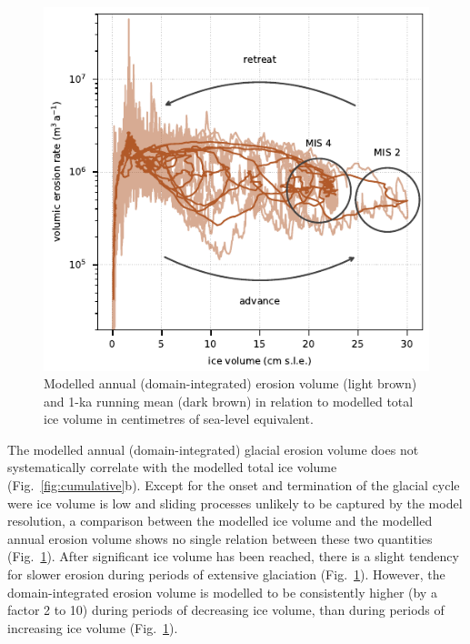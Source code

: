 \documentclass[esurf, manuscript]{copernicus}
\begin{document}
    \begin{figure}[ht]
      \centerline{\includegraphics{alpero_evolution}}
      \caption{%
        Modelled annual (domain-integrated) erosion volume (light brown) and 1-ka
        running mean (dark brown) in relation to modelled total ice volume in
        centimetres of sea-level equivalent.}
      \label{fig:evolution}
    \end{figure}

    The modelled annual (domain-integrated) glacial erosion volume
    does not systematically correlate with the modelled total ice volume
    (Fig.~\ref{fig:cumulative}b). Except for the onset and termination of the
    glacial cycle were ice volume is low and sliding processes unlikely to be
    captured by the model resolution, a comparison between the modelled ice
    volume and the modelled annual erosion volume shows no single relation
    between these two quantities (Fig.~\ref{fig:evolution}). After significant
    ice volume has been reached, there is a slight tendency for slower erosion
    during periods of extensive glaciation (Fig.~\ref{fig:evolution}). However,
    the domain-integrated erosion volume is modelled to be consistently higher
    (by a factor 2 to 10) during periods of decreasing ice volume, than during
    periods of increasing ice volume (Fig.~\ref{fig:evolution}).

\end{document}
